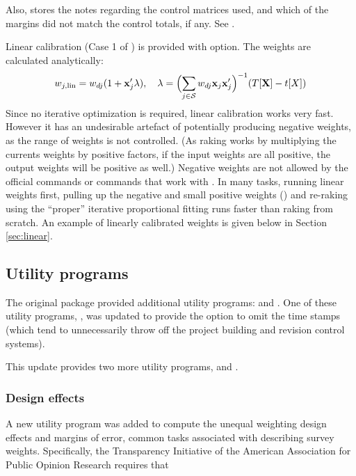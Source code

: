 Also,  stores the notes regarding the control matrices
used, and which of the margins did not match the control totals, if any.
See .

Linear calibration (Case 1 of \citet{deville:sarndal:1992}) is provided with
 option. The weights are calculated analytically:
\begin{equation}
    \label{eq:linear:weight}
    w_{j,\rm{lin}} = w_{dj} (1+\mathbf{x}_j'\mathbf{\lambda}),
    \quad
    \mathbf{\lambda} = \Bigl( \sum_{j \in \mathcal{S}} w_{dj} \mathbf{x}_j \mathbf{x}_j' \Bigr)^{-1}
        ( T [ \mathbf{X}  ] - t[X] )
\end{equation}
Since no iterative optimization is required, linear calibration works very fast.
However it has an undesirable artefact of potentially producing negative weights,
as the range of weights is not controlled. (As raking works by multiplying the currents
weights by positive factors, if the input weights are all positive, the output weights
will be positive as well.) Negative weights are not allowed by the official  commands
or commands that work with \stcmd{[pweights]}.
In many tasks, running linear weights first,
pulling up the negative and small positive weights ()
and re-raking using the ``proper'' iterative proportional fitting runs faster than
raking from scratch. An example of linearly calibrated weights is given below
in Section \ref{sec:linear}.


\subsection{Utility programs}
\label{subsec:utility}

The original package  provided additional utility programs:
 and . 
One of these utility programs, ,
was updated to provide the  option to omit the time stamps
(which tend to unnecessarily throw off the project building and revision control systems).

This update provides two more utility programs,
 and .

\subsubsection{Design effects}

A new utility program 
was added to compute the unequal weighting design effects and margins of error, common tasks associated
with describing survey weights. Specifically, the Transparency Initiative
of the American Association for Public Opinion Research
\citep{aapor:2014:ti:terms}
requires that

